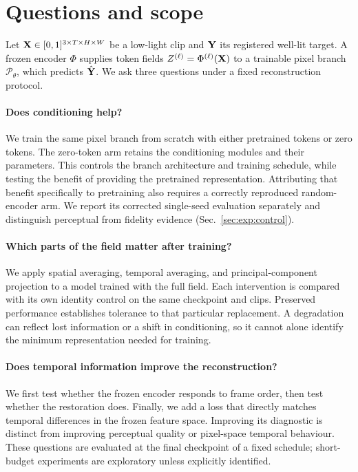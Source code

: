 \section{Questions and scope}\label{sec:prelim}

Let $\mathbf{X}\in[0,1]^{3\times T\times H\times W}$ be a low-light clip and $\mathbf{Y}$ its
registered well-lit target. A frozen encoder $\Phi$ supplies token fields
$Z^{(\ell)}=\Phi^{(\ell)}(\mathbf{X})$ to a trainable pixel branch
$\mathcal P_\theta$, which predicts $\hat{\mathbf{Y}}$.
We ask three questions under a fixed reconstruction protocol.

\paragraph{Does conditioning help?}
We train the same pixel branch from scratch with either pretrained tokens or
zero tokens. The zero-token arm retains the conditioning modules and their
parameters. This controls the branch architecture and training schedule, while
testing the benefit of providing the pretrained representation. Attributing
that benefit specifically to pretraining also requires a correctly reproduced
random-encoder arm. We report its corrected single-seed evaluation separately
and distinguish perceptual from fidelity evidence (Sec.~\ref{sec:exp:control}).

\paragraph{Which parts of the field matter after training?}
We apply spatial averaging, temporal averaging, and principal-component
projection to a model trained with the full field. Each intervention is
compared with its own identity control on the same checkpoint and clips.
Preserved performance establishes tolerance to that particular replacement.
A degradation can reflect lost information or a shift in conditioning, so it
cannot alone identify the minimum representation needed for training.

\paragraph{Does temporal information improve the reconstruction?}
We first test whether the frozen encoder responds to frame order, then test
whether the restoration does. Finally, we add a loss that directly matches
temporal differences in the frozen feature space. Improving its diagnostic is
distinct from improving perceptual quality or pixel-space temporal behaviour.
These questions are evaluated at the final checkpoint of a fixed schedule;
short-budget experiments are exploratory unless explicitly identified.

